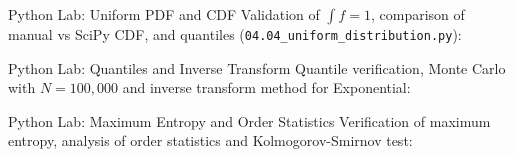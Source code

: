 \documentclass[aspectratio=169,xcolor={dvipsnames,table}]{beamer}
\begin{document}
\begin{frame}[fragile]{Python Lab: Uniform PDF and CDF}
	\vspace{-0.05cm}
	\scriptsize
	Validation of $\int f = 1$, comparison of manual vs SciPy CDF, and quantiles (\texttt{04.04\_uniform\_distribution.py}):
	\vspace{0.02cm}
	{
	}
\end{frame}

\begin{frame}[fragile]{Python Lab: Quantiles and Inverse Transform}
	\vspace{-0.05cm}
	\scriptsize
	Quantile verification, Monte Carlo with $N=100{,}000$ and inverse transform method for Exponential:
	\vspace{0.02cm}
	{
	}
\end{frame}

\begin{frame}[fragile]{Python Lab: Maximum Entropy and Order Statistics}
	\vspace{-0.05cm}
	\scriptsize
	Verification of maximum entropy, analysis of order statistics and Kolmogorov-Smirnov test:
	\vspace{0.02cm}
	{
	}
\end{frame}
\end{document}
